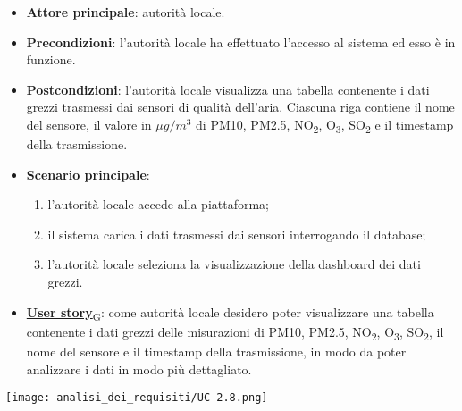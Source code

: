 \begin{itemize}
	\item \textbf{Attore principale}: autorità locale.
	\item \textbf{Precondizioni}: l'autorità locale ha effettuato l'accesso al sistema ed esso è in funzione.
	\item \textbf{Postcondizioni}: l'autorità locale visualizza una tabella contenente i dati grezzi trasmessi dai sensori di qualità dell'aria.
	      Ciascuna riga contiene il nome del sensore, il valore in $\mu g/m^3$ di PM10, PM2.5, NO\textsubscript{2}, O\textsubscript{3}, SO\textsubscript{2} e il timestamp della trasmissione.
	\item \textbf{Scenario principale}:
	      \begin{enumerate}
		      \item l'autorità locale accede alla piattaforma;
		      \item il sistema carica i dati trasmessi dai sensori interrogando il database;
		      \item l'autorità locale seleziona la visualizzazione della dashboard dei dati grezzi.
	      \end{enumerate}
	\item \href{https://7last.github.io/docs/rtb/documentazione-interna/glossario\#user-story}{\textbf{User story}\textsubscript{G}}:
	      come autorità locale desidero poter visualizzare una tabella contenente i dati grezzi delle misurazioni di PM10, PM2.5, NO\textsubscript{2}, O\textsubscript{3}, SO\textsubscript{2},
	      il nome del sensore e il timestamp della trasmissione, in modo da poter analizzare i dati in modo più dettagliato.
\end{itemize}
\begin{center}
	\texttt{[image: analisi\_dei\_requisiti/UC-2.8.png]}
\end{center}


